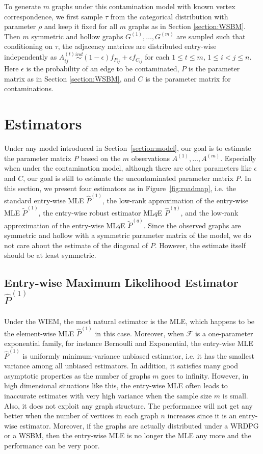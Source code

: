 \documentclass[a4paper]{article}
\renewcommand{\hat}{\widehat}
\begin{document}
To generate $m$ graphs under this contamination model with known vertex correspondence, we first sample $\tau$ from the categorical distribution with parameter $\rho$ and keep it fixed for all $m$ graphs as in Section \ref{section:WSBM}. Then $m$ symmetric and hollow graphs $G^{(1)}, \dotsc, G^{(m)}$ are sampled such that conditioning on $\tau$, the adjacency matrices are distributed entry-wise independently as $A^{(t)}_{ij} \stackrel{ind}{\sim} (1-\epsilon) f_{P_{ij}} + \epsilon f_{C_{ij}}$ for each $1 \le t \le m$, $1 \le i < j \le n$. Here $\epsilon$ is the probability of an edge to be contaminated, $P$ is the parameter matrix as in Section \ref{section:WSBM}, and $C$ is the parameter matrix for contaminations.



\section{Estimators}

Under any model introduced in Section~\ref{section:model}, our goal is to estimate the parameter matrix $P$ based on the $m$ observations $A^{(1)}, \dotsc, A^{(m)}$. Especially when under the contamination model, although there are other parameters like $\epsilon$ and $C$, our goal is still to estimate the uncontaminated parameter matrix $P$. In this section, we present four estimators as in Figure~\ref{fig:roadmap}, i.e. the standard entry-wise MLE $\hat{P}^{(1)}$, the low-rank approximation of the entry-wise MLE $\widetilde{P}^{(1)}$, the entry-wise robust estimator ML$q$E $\hat{P}^{(q)}$, and the low-rank approximation of the entry-wise ML$q$E $\widetilde{P}^{(q)}$. Since the observed graphs are symmetric and hollow with a symmetric parameter matrix of the model, we do not care about the estimate of the diagonal of $P$. However, the estimate itself should be at least symmetric.

\subsection{Entry-wise Maximum Likelihood Estimator $\hat{P}^{(1)}$}

Under the WIEM, the most natural estimator is the MLE, which happens to be the element-wise MLE $\hat{P}^{(1)}$ in this case.
Moreover, when $\mathcal{F}$ is a one-parameter exponential family, for instance Bernoulli and Exponential, the entry-wise MLE $\hat{P}^{(1)}$ is uniformly minimum-variance unbiased estimator, i.e. it has the smallest variance among all unbiased estimators. In addition, it satisfies many good asymptotic properties as the number of graphs $m$ goes to infinity.
However, in high dimensional situations like this, the entry-wise MLE often leads to inaccurate estimates with very high variance when the sample size $m$ is small. Also, it does not exploit any graph structure. The performance will not get any better when the number of vertices in each graph $n$ increases since it is an entry-wise estimator. Moreover, if the graphs are actually distributed under a WRDPG or a WSBM, then the entry-wise MLE is no longer the MLE any more and the performance can be very poor.
\end{document}
